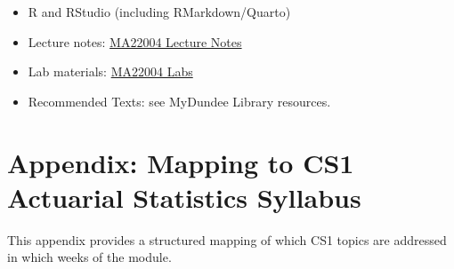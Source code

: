 \documentclass[
  a4paper,
  DIV=11,
  numbers=noendperiod,
  oneside]{scrreprt}
\providecommand{\tightlist}{%
  \setlength{\itemsep}{0pt}\setlength{\parskip}{0pt}}
\theoremstyle{plain}
\theoremstyle{definition}
\theoremstyle{definition}
\theoremstyle{definition}
\theoremstyle{plain}
\theoremstyle{remark}
\begin{document}

\begin{itemize}
\tightlist
\item
  R and RStudio (including RMarkdown/Quarto)\\
\item
  Lecture notes: \href{https://dundeemath.github.io/MA22004/}{MA22004
  Lecture Notes}\\
\item
  Lab materials:
  \href{https://dundeemath.github.io/MA22004labs/}{MA22004 Labs}\\
\item
  Recommended Texts: see MyDundee Library resources.
\end{itemize}

\section*{Appendix: Mapping to CS1 Actuarial Statistics
Syllabus}\label{appendix-mapping-to-cs1-actuarial-statistics-syllabus}


This appendix provides a structured mapping of which CS1 topics are
addressed in which weeks of the module.
\end{document}
